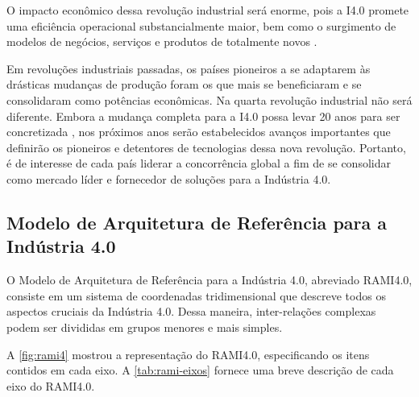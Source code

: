	O impacto econômico dessa revolução industrial será enorme, pois a I4.0 promete uma eficiência operacional substancialmente maior, bem como o surgimento de modelos de negócios, serviços e produtos de totalmente novos \cite{hermann2016design}.
	
	Em revoluções industriais passadas, os países pioneiros a se adaptarem às drásticas mudanças de produção foram os que mais se beneficiaram e se consolidaram como potências econômicas. Na quarta revolução industrial não será diferente. Embora a mudança completa para a I4.0 possa levar 20 anos para ser concretizada \cite{russmann2015industryfour}, nos próximos anos serão estabelecidos avanços importantes que definirão os pioneiros e detentores de tecnologias dessa nova revolução. Portanto, é de interesse de cada país liderar a concorrência global a fim de se consolidar como mercado líder e fornecedor de soluções para a Indústria 4.0.

	\subsection{Modelo de Arquitetura de Referência para a Indústria 4.0}
	\label{sub:rami4}
	
	O Modelo de Arquitetura de Referência para a Indústria 4.0, abreviado RAMI4.0, consiste em um sistema de coordenadas tridimensional que descreve todos os aspectos cruciais da Indústria 4.0. Dessa maneira, inter-relações complexas podem ser divididas em grupos menores e mais simples.
	
	A \autoref{fig:rami4} mostrou a representação do RAMI4.0, especificando os itens contidos em cada eixo. A \autoref{tab:rami-eixos} fornece uma breve descrição de cada eixo do RAMI4.0.
	
